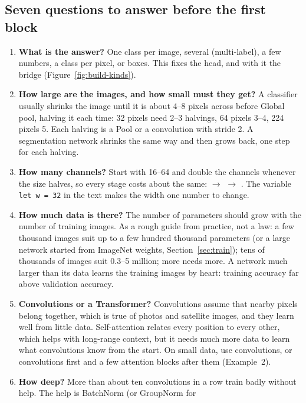 \subsection{Seven questions to answer before the first block}
\label{sec:build-questions}
\begin{enumerate}[leftmargin=*]
  \item \textbf{What is the answer?} One class per image, several (multi-label), a few numbers, a class per pixel, or boxes. This fixes
        the head, and with it the bridge (Figure~\ref{fig:build-kinds}).
  \item \textbf{How large are the images, and how small must they get?} A classifier usually shrinks the image until it is about
        4--8 pixels across before Global pool, halving it each time: 32 pixels need 2--3 halvings, 64 pixels 3--4, 224 pixels 5. Each
        halving is a Pool or a convolution with stride 2. A segmentation network shrinks the same way and then grows back, one step for
        each halving.
  \item \textbf{How many channels?} Start with 16--64 and double the channels whenever the size halves, so every stage costs about
        the same:  $\rightarrow$  $\rightarrow$ . The variable \texttt{let w = 32}
        in the text makes the width one number to change.
  \item \textbf{How much data is there?} The number of parameters should grow with the number of training images. As a rough guide
        from practice, not a law: a few thousand images suit up to a few hundred thousand parameters (or a large network started from
        ImageNet weights, Section~\ref{sec:train}); tens of thousands of images suit 0.3--5 million; more needs more. A network much
        larger than its data learns the training images by heart: training accuracy far above validation accuracy.
  \item \textbf{Convolutions or a Transformer?} Convolutions assume that nearby pixels belong together, which is true of photos and
        satellite images, and they learn well from little data. Self-attention relates every position to every other, which helps with
        long-range context, but it needs much more data to learn what convolutions know from the start. On small data, use convolutions,
        or convolutions first and a few attention blocks after them (Example~2).
  \item \textbf{How deep?} More than about ten convolutions in a row train badly without help. The help is BatchNorm (or GroupNorm for

\end{enumerate}
